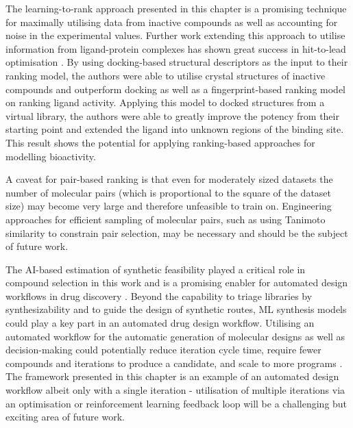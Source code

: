 The learning-to-rank approach presented in this chapter is a promising technique for maximally utilising data from inactive compounds as well as accounting for noise in the experimental values. Further work extending this approach to utilise information from ligand-protein complexes has shown great success in hit-to-lead optimisation \cite{Saar2023pnas}. By using docking-based structural descriptors as the input to their ranking model, the authors were able to utilise crystal structures of inactive compounds and outperform docking as well as a fingerprint-based ranking model on ranking ligand activity. Applying this model to docked structures from a virtual library, the authors were able to greatly improve the potency from their starting point and extended the ligand into unknown regions of the binding site. This result shows the potential for applying ranking-based approaches for modelling bioactivity.

A caveat for pair-based ranking is that even for moderately sized datasets the number of molecular pairs (which is proportional to the square of the dataset size) may become very large and therefore unfeasible to train on. Engineering approaches for efficient sampling of molecular pairs, such as using Tanimoto similarity to constrain pair selection, may be necessary and should be the subject of future work.

The AI-based estimation of synthetic feasibility played a critical role in compound selection in this work and is a promising enabler for automated design workflows in drug discovery \cite{Goldman2022ChemicalDesignLevels}. Beyond the capability to triage libraries by synthesizability and to guide the design of synthetic routes, ML synthesis models could play a key part in an automated drug design workflow. Utilising an automated workflow for the automatic generation of molecular designs as well as decision-making could potentially reduce iteration cycle time, require fewer compounds and iterations to produce a candidate, and scale to more programs \cite{Schneider2018AutomatingDrugDiscovery, Coley2020Outlook}. The framework presented in this chapter is an example of an automated design workflow albeit only with a single iteration - utilisation of multiple iterations via an optimisation \cite{korovina2019chembo} or reinforcement learning feedback loop \cite{born2019paccmannrl} will be a challenging but exciting area of future work.


